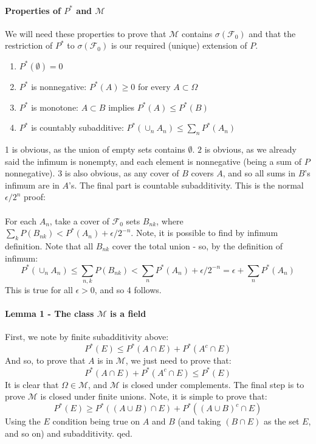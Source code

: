 \documentclass[12pt,a4paper]{article}
\newcommand{\1}[1]{\mathbbm{1}\left\{ #1 \right\}}
\newcommand{\fcal}{\mathcal{F}}
\newcommand{\mcal}{\mathcal{M}}
\begin{document}
\paragraph{Properties of $P^*$ and $\mcal$} We will need these properties to prove that $\mcal$ contains $\sigma(\fcal_0)$ and that the restriction of $P^*$ to $\sigma(\fcal_0)$ is our required (unique) extension of $P$.
\begin{enumerate}
	\item $P^*(\emptyset) = 0$
	\item $P^*$ is nonnegative: $P^*(A) \geq 0$ for every $A \subset \Omega$
	\item $P^*$ is monotone: $A \subset B$ implies $P^*(A) \leq P^*(B)$
	\item $P^*$ is countably subadditive: $P^*(\cup_n A_n) \leq \sum_n P^*(A_n)$
\end{enumerate}
1 is obvious, as the union of empty sets contains $\emptyset$. $2$ is obvious, as we already said the infimum is nonempty, and each element is nonnegative (being a sum of $P$ nonnegative). $3$ is also obvious, as any cover of $B$ covers $A$, and so all sums in $B$'s infimum are in $A$'s. The final part is countable subadditivity. This is the normal $\epsilon/2^n$ proof:
\\\\
For each $A_n$, take a cover of $\fcal_0$ sets $B_{nk}$, where $\sum_k P(B_{nk}) < P^*(A_n) + \epsilon/2^{-n}$. Note, it is possible to find by infimum definition. Note that all $B_{nk}$ cover the total union - so, by the definition of infimum:
$$
	P^*(\cup_n A_n) \leq \sum_{n,k} P(B_{nk}) < \sum_n P^*(A_n) + \epsilon/2^{-n} = \epsilon + \sum_n P^*(A_n)
$$
This is true for all $\epsilon > 0$, and so 4 follows.

\paragraph{Lemma 1 - The class $\mcal$ is a field} First, we note by finite subadditivity above:
$$
	P^*(E) \leq P^*(A \cap E) + P^*(A^c \cap E)
$$
And so, to prove that $A$ is in $\mcal$, we just need to prove that:
$$
	P^*(A \cap E) + P^*(A^c \cap E) \leq P^*(E)
$$
It is clear that $\Omega \in \mcal$, and $\mcal$ is closed under complements. The final step is to prove $\mcal$ is closed under finite unions. Note, it is simple to prove that:
$$
	P^*(E) \geq P^*((A \cup B) \cap E) + P^*((A \cup B)^c \cap E)
$$
Using the $E$ condition being true on $A$ and $B$ (and taking $(B \cap E)$ as the set $E$, and so on) and subadditivity. qed.
\end{document}
